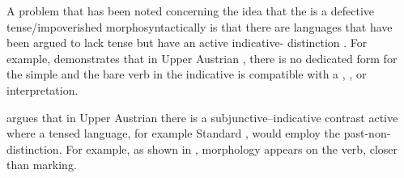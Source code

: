 \documentclass[output=paper,modfonts,newtxmath,hidelinks,]{langscibook}
\begin{document}
A problem that has been noted concerning the idea that the  is a defective tense/impoverished morphosyntactically is that there are languages that have been argued to lack tense but have an active indicative- distinction \citep{Wiltschko}. For example, \citet{Wiltschko} demonstrates that in Upper Austrian , there is no dedicated form for the simple  and the bare verb in the indicative is compatible with a , , or  interpretation.

\ea \label{10:ex19}
	\z
\z

\noindent \citet{Wiltschko} argues that in Upper Austrian  there is a subjunctive--indicative contrast active where a tensed language, for example Standard , would employ the past-non- distinction. For example, as shown in ,  morphology appears on the verb, closer than  marking.

\ea \label{10:ex20}
	\z
\z
\end{document}
